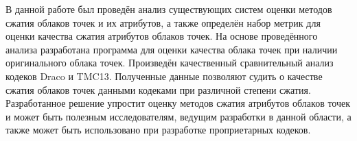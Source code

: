 В данной работе был проведён анализ существующих систем оценки методов сжатия
облаков точек и их атрибутов, а также определён набор метрик для оценки качества
сжатия атрибутов облаков точек. На основе проведённого анализа разработана
программа для оценки качества облака точек при наличии оригинального облака
точек. Произведён качественный сравнительный анализ кодеков Draco и TMC13.
Полученные данные позволяют судить о качестве сжатия облаков точек данными
кодеками при различной степени сжатия. Разработанное решение упростит оценку
методов сжатия атрибутов облаков точек и может быть полезным исследователям,
ведущим разработки в данной области, а также может быть использовано при
разработке проприетарных кодеков.